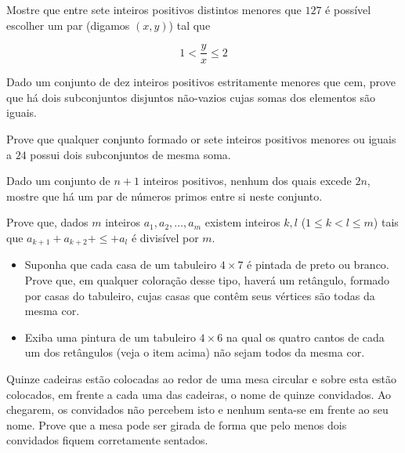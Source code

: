 \begin{questao}
  Mostre que entre sete inteiros positivos distintos menores que $127$ é
  possível escolher um par (digamos $(x,y)$) tal que

  $$1 < \frac{y}{x} \leq 2$$
\end{questao}

\begin{questao}
  Dado um conjunto de dez inteiros positivos estritamente menores que cem, prove
  que há dois subconjuntos disjuntos não-vazios cujas somas dos elementos são
  iguais.
\end{questao}

\begin{questao}
  Prove que qualquer conjunto formado or sete inteiros positivos menores ou
  iguais a $24$ possui dois subconjuntos de mesma soma.
\end{questao}

\begin{questao}
  Dado um conjunto de $n+1$ inteiros positivos, nenhum dos
  quais excede $2n$, mostre que há um par de números primos entre si
  neste conjunto.
\end{questao}

\begin{questao}
  Prove que, dados $m$ inteiros $a_1,a_2,\ldots,a_m$ existem inteiros $k,l$
  ($1 \leq k < l \leq m$) tais que $a_{k+1}+a_{k+2}+\leq+a_l$ é divisível por
  $m$.
\end{questao}

\begin{questao}
  \begin{itemize}
    \item Suponha que cada casa de um tabuleiro $4 \times 7$ é pintada
    de preto ou branco. Prove que, em qualquer coloração desse tipo,
    haverá um retângulo, formado por casas do tabuleiro, cujas casas
    que contêm seus vértices são todas da mesma cor.

    \item Exiba uma pintura de um tabuleiro $4 \times 6$ na qual os
    quatro cantos de cada um dos retângulos (veja o item acima) não
    sejam todos da mesma cor.
  \end{itemize}
\end{questao}

\begin{questao}
  Quinze cadeiras estão colocadas ao redor de uma mesa
  circular e sobre esta estão colocados, em frente a cada uma das
  cadeiras, o nome de quinze convidados. Ao chegarem, os convidados
  não percebem isto e nenhum senta-se em frente ao seu nome. Prove que
  a mesa pode ser girada de forma que pelo menos dois convidados
  fiquem corretamente sentados.
\end{questao}

